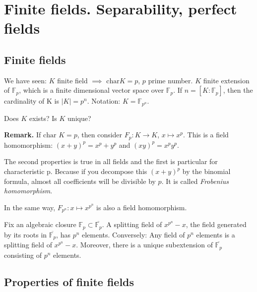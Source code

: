 \chapter{Finite fields. Separability, perfect fields}

\section{Finite fields}

We have seen: $K$ finite field $\implies$ $\text{char}K=p$, $p$ prime number. $K$ finite extension of $\mathbb{F}_p$, which is a finite dimensional vector space over $\mathbb{F}_p$. If $n=[K:\mathbb{F}_p]$, then the cardinality of K is $|K|=p^n$. Notation: $K =\mathbb{F}_{p^n}$. 

Does $K$ exists? Is $K$ unique?

\textbf{Remark.} If $\text{char }K=p$, then consider $F_p:K\to K$, $x\mapsto x^p$. This is a field homomorphism: $(x + y)^p= x^p + y^p$ and $(xy)^p = x^p y^p$. 

The second properties is true in all fields and the first is particular for characteristic p. Because if you decompose this $(x + y)^p$ by the binomial formula, almost all coefficients will be divisible by $p$.  It is called \textit{Frobenius homomorphism}.

In the same way, $F_{p^n}: x \mapsto x^{p^n}$ is also a field homomorphism.

\begin{theorem}
Fix an algebraic closure $\mathbb{F}_p\subset\overbar{\mathbb{F}_p}$. A splitting field of $x^{p^n} - x$, the field generated by its roots in $\overbar{\mathbb{F}_p}$, has $p^n$ elements. Conversely: Any field of $p^n$ elements is a splitting field of $x^{p^n} - x$. Moreover, there is a unique subextension of $\overbar{\mathbb{F}_p}$ consisting of $p^n$ elements.
\end{theorem}


\section{Properties of finite fields}

